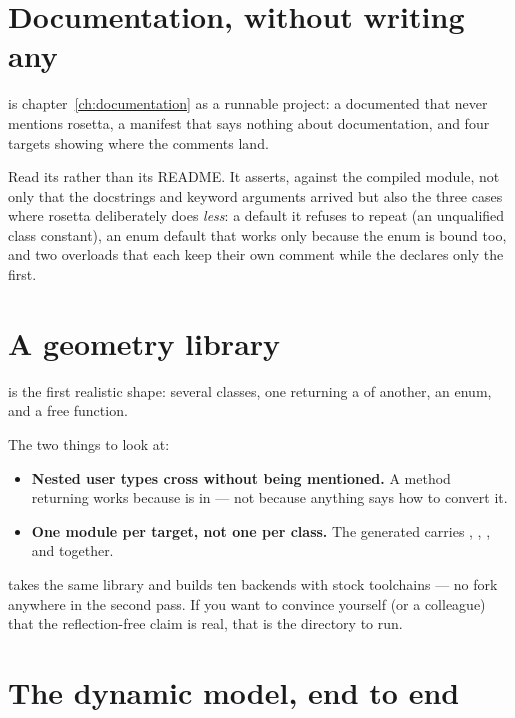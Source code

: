 \section{Documentation, without writing any}

 is chapter~\ref{ch:documentation} as a runnable
project: a documented  that never mentions rosetta, a manifest
that says nothing about documentation, and four targets showing where the
comments land.

Read its  rather than its README. It asserts, against the
compiled module, not only that the docstrings and keyword arguments arrived but
also the three cases where rosetta deliberately does \emph{less}: a default it
refuses to repeat (an unqualified class constant), an enum default that works
only because the enum is bound too, and two  overloads that each
keep their own comment while the  declares only the first.

\section{A geometry library}

 is the first realistic shape: several classes, one
returning a  of another, an enum, and a free function.

The two things to look at:

\begin{itemize}
  \item \textbf{Nested user types cross without being mentioned.} A
     method returning  works because
     is in  --- not because anything says how to
    convert it.
  \item \textbf{One module per target, not one per class.} The generated
     carries , , ,
     and  together.
\end{itemize}

 takes the same library and builds ten backends
with stock toolchains --- no fork anywhere in the second pass. If you want to
convince yourself (or a colleague) that the reflection-free claim is real, that
is the directory to run.

\section{The dynamic model, end to end}

